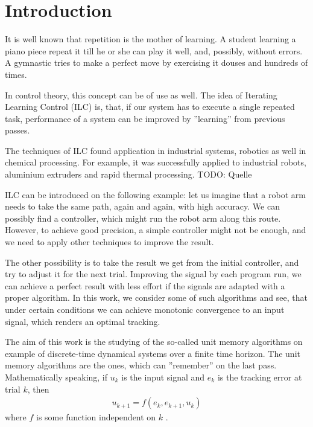 \chapter{Introduction}

It is well known that repetition is the mother of learning. A student learning a piano piece repeat it till he or she can play it well, and, possibly, without errors. 
A gymnastic tries to make a perfect move by exercising it douses and hundreds of times. 

In control theory, this concept can be of use as well. 
The idea of Iterating Learning Control (ILC) is, that, if our system has to execute a single repeated task, performance of a system can be improved by ''learning'' from previous passes.

The techniques of ILC found application in industrial systems, robotics as well in chemical processing. For example, it was successfully applied to industrial robots, aluminium extruders and rapid thermal processing.  TODO: Quelle 

ILC can be introduced on the following example: let us imagine that a robot arm needs to take the same path, again and again, with high accuracy. We can possibly find a controller, which might run the robot arm along this route. However, to achieve good precision, a simple controller might not be enough, and we need to apply other techniques to improve the result. 

The other possibility is to take the result we get from the initial controller, and try to adjust it for the next trial. Improving the signal by each program run, we can achieve a perfect result with less effort if the signals are adapted with a proper algorithm. 
In this work, we consider some of such algorithms and see, that under certain conditions we can achieve monotonic convergence to an input signal, which renders an optimal tracking. 

The aim of this work is the studying of the so-called unit memory algorithms on example of discrete-time dynamical systems over a finite time horizon. The unit memory algorithms are the ones, which can ''remember'' on the last pass. Mathematically speaking, if $u_k$ is the input signal and $e_k$ is the tracking error at trial $k$, then
\begin{align}
u_{k+1} = f(e_k, e_{k+1}, u_k)
\end{align}
where $f$ is some function independent on $k$ \cite{ILC}. 


